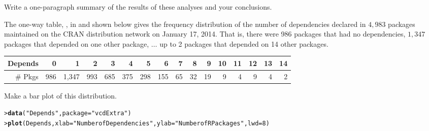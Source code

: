 \documentclass[10pt]{report}\usepackage[]{graphicx}\usepackage[]{color}
\makeatletter
\newcommand{\hlnum}[1]{\textcolor[rgb]{0.686,0.059,0.569}{#1}}%
\newcommand{\hlstr}[1]{\textcolor[rgb]{0.192,0.494,0.8}{#1}}%
\newcommand{\hlstd}[1]{\textcolor[rgb]{0.345,0.345,0.345}{#1}}%
\newcommand{\hlkwc}[1]{\textcolor[rgb]{0.333,0.667,0.333}{#1}}%
\newcommand{\hlkwd}[1]{\textcolor[rgb]{0.737,0.353,0.396}{\textbf{#1}}}%
\newenvironment{kframe}{%
 \def\at@end@of@kframe{}%
 \ifinner\ifhmode%
  \def\at@end@of@kframe{\end{minipage}}%
  \begin{minipage}{\columnwidth}%
 \fi\fi%
 \def\FrameCommand##1{\hskip\@totalleftmargin \hskip-\fboxsep
 \colorbox{shadecolor}{##1}\hskip-\fboxsep
     \hskip-\linewidth \hskip-\@totalleftmargin \hskip\columnwidth}%
 \MakeFramed {\advance\hsize-\width
   \@totalleftmargin\z@ \linewidth\hsize
   \@setminipage}}%
 {\par\unskip\endMakeFramed%
 \at@end@of@kframe}
\newenvironment{knitrout}{}{} %
\renewenvironment{knitrout}{\small\renewcommand{\baselinestretch}{.85}}{} %
\makeatother
\begin{document}
\begin{Exercises}
\begin{enumerate*}
\begin{ans}
\begin{knitrout}
\end{knitrout}
    \end{ans}
    
    \item Write a one-paragraph summary of the results of these analyses and your
    conclusions.
    \begin{ans}
    \end{ans}
    
  \end{enumerate*}


\exercise\exhard
  The one-way table, , in  and shown below gives the frequency
  distribution of the number of dependencies declared in $4,983$ \R packages
  maintained on the CRAN distribution network on January 17, 2014. That is, there were 986
  packages that had no dependencies, $1,347$ packages that depended on one other package, $\dots$
  up to 2 packages that depended on 14 other packages.

\begin{table}[ht]
\centering
\begin{tabular}{r|rrrrrrrrrrrrrrr}
  \hline
Depends & 0 & 1 & 2 & 3 & 4 & 5 & 6 & 7 & 8 & 9 & 10 & 11 & 12 & 13 & 14 \\
  \hline
\# Pkgs & 986 & 1,347 & 993 & 685 & 375 & 298 & 155 &  65 &  32 &  19 &   9 &   4 &   9 &   4 &   2 \\
   \hline
\end{tabular}
\end{table}

    \begin{enumerate*}
      \item Make a bar plot of this distribution.
      \begin{ans}
\begin{knitrout}\footnotesize
{}\color{fgcolor}\begin{kframe}
\begin{alltt}
\hlstd{> }\hlkwd{data}\hlstd{(}\hlstr{"Depends"}\hlstd{,} \hlkwc{package}\hlstd{=}\hlstr{"vcdExtra"}\hlstd{)}
\hlstd{> }\hlkwd{plot}\hlstd{(Depends,} \hlkwc{xlab}\hlstd{=}\hlstr{"Number of Dependencies"}\hlstd{,} \hlkwc{ylab}\hlstd{=}\hlstr{"Number of R Packages"}\hlstd{,} \hlkwc{lwd}\hlstd{=}\hlnum{8}\hlstd{)}
\end{alltt}
\end{kframe}


\end{knitrout}
\end{ans}
\end{enumerate*}
\end{Exercises}
\end{document}
